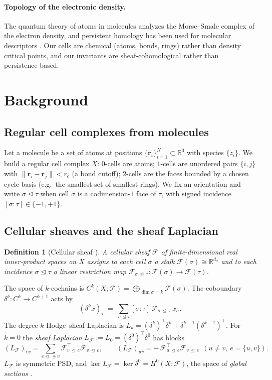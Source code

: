 \documentclass[pdflatex,sn-mathphys-num]{sn-jnl}%
\newcommand{\R}{\mathbb{R}}
\newcommand{\F}{\mathcal{F}}
\newcommand{\X}{X}
\newcommand{\rr}{\mathbf{r}}
\newcommand{\incid}{\trianglelefteq}
\newcommand{\restr}[2]{\F_{#1\,\incid\,#2}}
\theoremstyle{thmstyleone}
\theoremstyle{thmstyletwo}
\theoremstyle{thmstylethree}
\newtheorem{definition}[theorem]{Definition}
\begin{document}
\paragraph{Topology of the electronic density.}
The quantum theory of atoms in molecules \cite{bader1990} analyzes the
Morse--Smale complex of the electron density, and persistent homology has been
used for molecular descriptors \cite{edelsbrunner2002,cangwei2017}. Our cells are
chemical (atoms, bonds, rings) rather than density critical points, and our
invariants are sheaf-cohomological rather than persistence-based.

\section{Background}\label{sec:background}

\subsection{Regular cell complexes from molecules}
Let a molecule be a set of atoms at positions $\{\rr_i\}_{i=1}^N\subset\R^3$ with
species $\{z_i\}$. We build a regular cell complex $\X$:
$0$-cells are atoms; $1$-cells are unordered pairs $\{i,j\}$ with
$\|\rr_i-\rr_j\|<r_c$ (a bond cutoff); $2$-cells are the faces bounded by a chosen
cycle basis (e.g.\ the smallest set of smallest rings). We fix an orientation and
write $\sigma\incid\tau$ when cell $\sigma$ is a codimension-$1$ face of $\tau$,
with signed incidence $[\sigma{:}\tau]\in\{-1,+1\}$.

\subsection{Cellular sheaves and the sheaf Laplacian}
\begin{definition}[Cellular sheaf {\cite{hansenghrist2019}}]\label{def:sheaf}
A cellular sheaf $\F$ of finite-dimensional real inner-product spaces on $\X$
assigns to each cell $\sigma$ a stalk $\F(\sigma)\cong\R^{d_\sigma}$ and to each
incidence $\sigma\incid\tau$ a linear restriction map
$\restr{\sigma}{\tau}:\F(\sigma)\to\F(\tau)$.
\end{definition}

The space of $k$-cochains is $C^k(\X;\F)=\bigoplus_{\dim\sigma=k}\F(\sigma)$. The
coboundary $\delta^k:C^k\to C^{k+1}$ acts by
\begin{equation}
(\delta^k x)_\tau \;=\; \sum_{\sigma\incid\tau} [\sigma{:}\tau]\,
\restr{\sigma}{\tau}\, x_\sigma .
\end{equation}
The degree-$k$ Hodge--sheaf Laplacian is
$L_k=(\delta^k)^\top\delta^k+\delta^{k-1}(\delta^{k-1})^\top$. For $k=0$ the
\emph{sheaf Laplacian} $L_\F:=L_0=(\delta^0)^\top\delta^0$ has blocks
\begin{equation}\label{eq:lapblocks}
(L_\F)_{vv}=\sum_{e\incid\,\ni v}\restr{v}{e}^\top\restr{v}{e},
\qquad
(L_\F)_{uv}=-\,\restr{u}{e}^\top\restr{v}{e}\ \ (u\neq v,\ e=\{u,v\}).
\end{equation}
$L_\F$ is symmetric PSD, and $\ker L_\F=\ker\delta^0=H^0(\X;\F)$, the space of
\emph{global sections} \cite{hansenghrist2019}.
\end{document}

